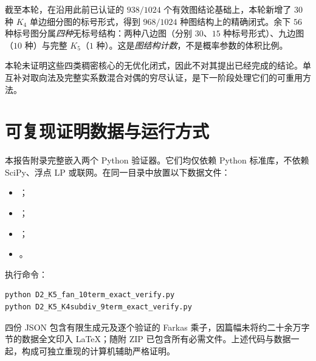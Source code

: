 \documentclass[UTF8,11pt,a4paper]{ctexart}
\begin{document}
截至本轮，在沿用此前已认证的 $938/1024$ 个有效图结论基础上，本轮新增了 $30$ 种 $K_4$ 单边细分图的标号形式，得到 $968/1024$ 种图结构上的精确闭式。余下 $56$ 种标号图分属\emph{四种}无标号结构：两种八边图（分别 $30$、$15$ 种标号形式）、九边图（$10$ 种）与完整 $K_5$（$1$ 种）。这是\emph{图结构计数}，不是概率参数的体积比例。

本轮未证明这些四类稠密核心的无优化闭式，因此不对其提出已经完成的结论。单互补对取向法及完整实系数混合对偶的穷尽认证，是下一阶段处理它们的可重用方法。

\section{可复现证明数据与运行方式}
本报告附录完整嵌入两个 Python 验证器。它们均仅依赖 Python 标准库，不依赖 SciPy、浮点 LP 或联网。在同一目录中放置以下数据文件：
\begin{itemize}
 \item {}；
 \item {}；
 \item {}；
 \item {}。
\end{itemize}
执行命令：
\begin{verbatim}
python D2_K5_fan_10term_exact_verify.py
python D2_K5_K4subdiv_9term_exact_verify.py
\end{verbatim}
四份 JSON 包含有限生成元及逐个验证的 Farkas 乘子，因篇幅未将约二十余万字节的数据全文印入 LaTeX；随附 ZIP 已包含所有必需文件。上述代码与数据一起，构成可独立重现的计算机辅助严格证明。

\appendix
\end{document}
